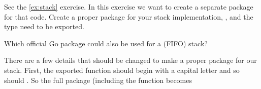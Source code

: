 \begin{Exercise}[title={Stack as package},difficulty=2]
\label{ex:stack-package}
See the \ref{ex:stack} exercise. In this exercise we want to create
a separate package for that code.
\Question\label{ex:stack-package q1} Create a proper package for your
stack implementation, ,  and the  type need to be
exported.

\Question\label{ex:stack-package q2} Which official Go package could
also be used for a (FIFO) stack?

\end{Exercise}

\begin{Answer}
\Question There are a few details that should be changed to make a proper package
for our stack. First, the exported function should begin with a capital 
letter and so should . So the full package (including the
 function becomes


\end{Answer}
